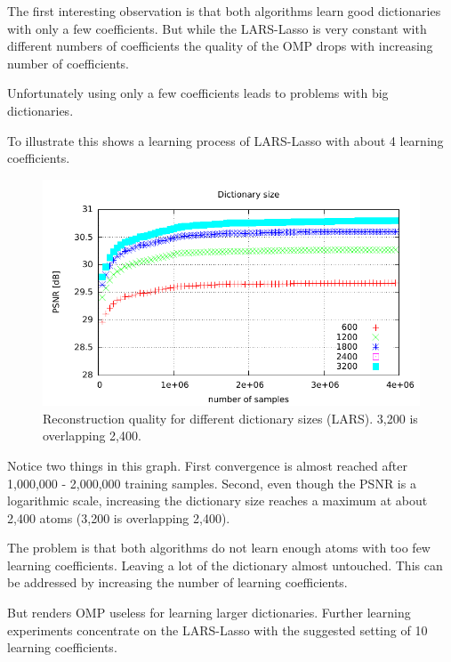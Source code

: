 
The first interesting observation is that both algorithms learn good
dictionaries with only a few coefficients. But while the LARS-Lasso is very
constant with different numbers of coefficients the quality of the OMP drops
with increasing number of coefficients. 


Unfortunately using only a few coefficients leads to problems with big
dictionaries. 

To illustrate this  shows a learning process of
LARS-Lasso with about 4 learning coefficients.
\begin{figure}[H]
\centering
\includegraphics[width = 1.0\textwidth]{../tests/results/dictSizeLasso.pdf}
\caption{Reconstruction quality for different dictionary sizes (LARS). 3,200 is
overlapping 2,400.}
\label{fig:dictSizeLassoBad}
\end{figure}
Notice two things in this graph. First convergence is almost reached
after 1,000,000 - 2,000,000 training samples. Second, even though the PSNR is a
logarithmic scale, increasing the dictionary size reaches a maximum at
about 2,400 atoms (3,200 is overlapping 2,400). 

The problem is that both algorithms do not learn enough atoms with too few
learning coefficients. Leaving a lot of the dictionary almost untouched. This
can be addressed by increasing the number of learning coefficients.

But renders OMP useless for learning larger dictionaries. Further learning
experiments concentrate on the LARS-Lasso with the suggested setting of 10
learning coefficients.

